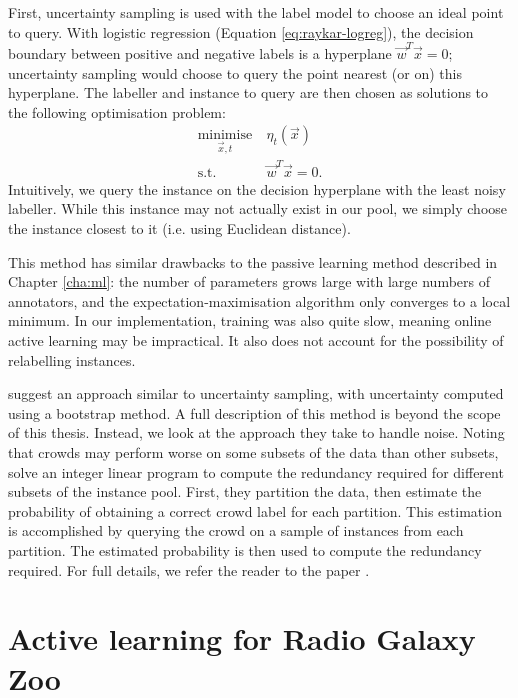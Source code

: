     First, uncertainty sampling is used with the label model to choose an ideal
    point to query. With logistic regression (Equation \ref{eq:raykar-logreg}),
    the decision boundary between positive and negative labels is a hyperplane
    $\vec w^T \vec x = 0$; uncertainty sampling would choose to query the point
    nearest (or on) this hyperplane. The labeller and instance to query are then
    chosen as solutions to the following optimisation problem:
    \begin{align*}
        \underset{\vec x, t}{\text{minimise}}\ & \eta_t(\vec x)\\
        \text{s.t. } & \vec w^T \vec x = 0.
    \end{align*}
    Intuitively, we query the instance on the decision hyperplane with the least
    noisy labeller. While this instance may not actually exist in our pool, we
    simply choose the instance closest to it (i.e. using Euclidean distance).

    This method has similar drawbacks to the \citeauthor{yan10} passive learning
    method described in Chapter \ref{cha:ml}: the number of parameters grows
    large with large numbers of annotators, and the expectation-maximisation
    algorithm only converges to a local minimum. In our implementation, training
    was also quite slow, meaning online active learning may be impractical. It
    also does not account for the possibility of relabelling instances.

    \citet{mozafari12} suggest an approach similar to uncertainty sampling, with
    uncertainty computed using a bootstrap method. A full description of this
    method is beyond the scope of this thesis. Instead, we look at the approach
    they take to handle noise. Noting that crowds may perform worse on some
    subsets of the data than other subsets, \citeauthor{mozafari12} solve an
    integer linear program to compute the redundancy required for different
    subsets of the instance pool. First, they partition the data, then estimate
    the probability of obtaining a correct crowd label for each partition. This
    estimation is accomplished by querying the crowd on a sample of instances
    from each partition. The estimated probability is then used to compute the
    redundancy required. For full details, we refer the reader to the paper
    \citep{mozafari12}.

\section{Active learning for Radio Galaxy Zoo}
\label{sec:al-rgz-ideal-experiment}
    
